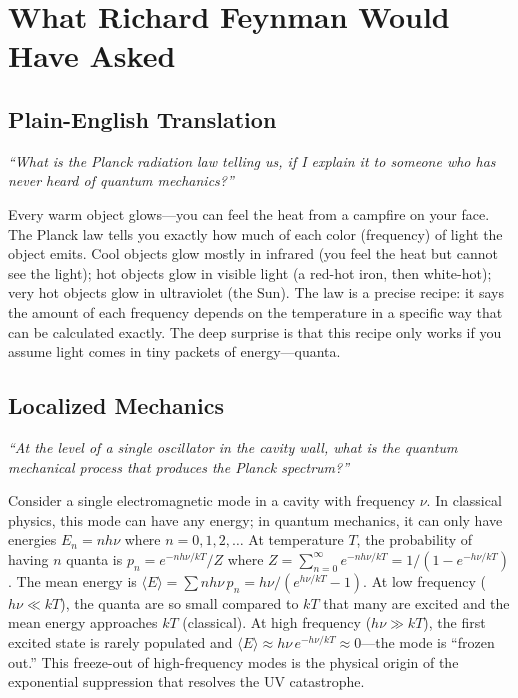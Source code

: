 \section*{What Richard Feynman Would Have Asked}

\subsection*{Plain-English Translation}
\textit{``What is the Planck radiation law telling us, if I explain it to someone who has never heard of quantum mechanics?''}

Every warm object glows---you can feel the heat from a campfire on your face. The Planck law tells you exactly how much of each color (frequency) of light the object emits. Cool objects glow mostly in infrared (you feel the heat but cannot see the light); hot objects glow in visible light (a red-hot iron, then white-hot); very hot objects glow in ultraviolet (the Sun). The law is a precise recipe: it says the amount of each frequency depends on the temperature in a specific way that can be calculated exactly. The deep surprise is that this recipe only works if you assume light comes in tiny packets of energy---quanta.

\subsection*{Localized Mechanics}
\textit{``At the level of a single oscillator in the cavity wall, what is the quantum mechanical process that produces the Planck spectrum?''}

Consider a single electromagnetic mode in a cavity with frequency $\nu$. In classical physics, this mode can have any energy; in quantum mechanics, it can only have energies $E_{n} = nh\nu$ where $n = 0, 1, 2, \ldots$ At temperature $T$, the probability of having $n$ quanta is $p_{n} = e^{-nh\nu/kT}/Z$ where $Z = \sum_{n=0}^{\infty} e^{-nh\nu/kT} = 1/(1 - e^{-h\nu/kT})$. The mean energy is $\langle E\rangle = \sum n h\nu\, p_{n} = h\nu/(e^{h\nu/kT} - 1)$. At low frequency ($h\nu \ll kT$), the quanta are so small compared to $kT$ that many are excited and the mean energy approaches $kT$ (classical). At high frequency ($h\nu \gg kT$), the first excited state is rarely populated and $\langle E\rangle \approx h\nu\, e^{-h\nu/kT} \approx 0$---the mode is ``frozen out.'' This freeze-out of high-frequency modes is the physical origin of the exponential suppression that resolves the UV catastrophe.

